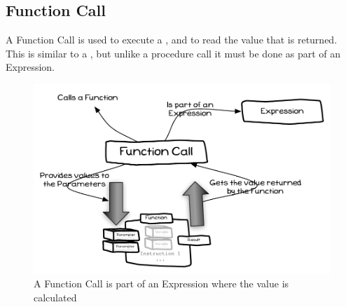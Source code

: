 \clearpage
\subsection{Function Call} %
\label{sub:function_call}

A Function Call is used to execute a , and to read the value that is returned. This is similar to a , but unlike a procedure call it must be done as part of an Expression.

\begin{figure}[h]
\includegraphics[width=\textwidth]{topics/storing-using-data/diagrams/FunctionCall} 
 \caption{A Function Call is part of an Expression where the value is calculated}
 \label{fig:storing-using-data-function-call}
\end{figure}



